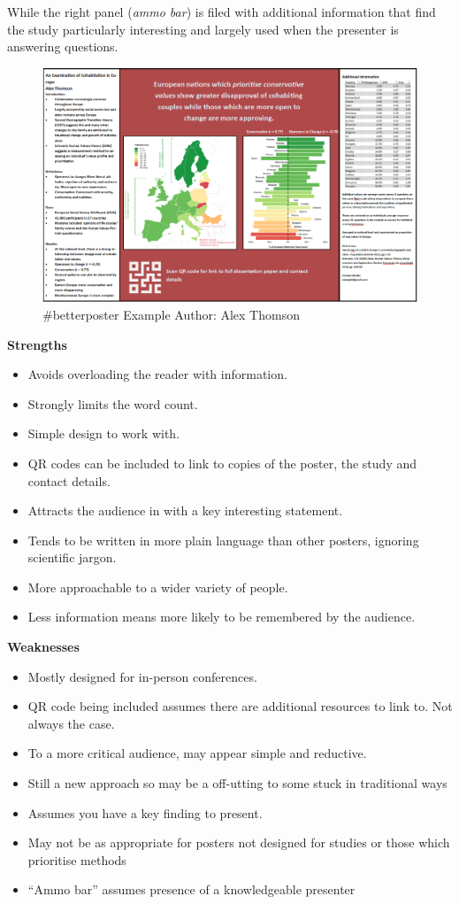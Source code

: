 \documentclass[
]{book}
\providecommand{\tightlist}{%
  \setlength{\itemsep}{0pt}\setlength{\parskip}{0pt}}
\begin{document}
While the right panel (\emph{ammo bar}) is filed with additional information that find the study particularly interesting and largely used when the presenter is answering questions.

\begin{figure}
\centering
\includegraphics{img/better poster example 1.png}
\caption{\#betterposter Example Author: Alex Thomson}
\end{figure}

\textbf{Strengths}

\begin{itemize}
\tightlist
\item
  Avoids overloading the reader with information.
\item
  Strongly limits the word count.
\item
  Simple design to work with.
\item
  QR codes can be included to link to copies of the poster, the study and contact details.
\item
  Attracts the audience in with a key interesting statement.
\item
  Tends to be written in more plain language than other posters, ignoring scientific jargon.
\item
  More approachable to a wider variety of people.
\item
  Less information means more likely to be remembered by the audience.
\end{itemize}

\textbf{Weaknesses}

\begin{itemize}
\tightlist
\item
  Mostly designed for in-person conferences.
\item
  QR code being included assumes there are additional resources to link to. Not always the case.
\item
  To a more critical audience, may appear simple and reductive.
\item
  Still a new approach so may be a off-utting to some stuck in traditional ways
\item
  Assumes you have a key finding to present.
\item
  May not be as appropriate for posters not designed for studies or those which prioritise methods
\item
  ``Ammo bar'' assumes presence of a knowledgeable presenter
\end{itemize}
\end{document}
